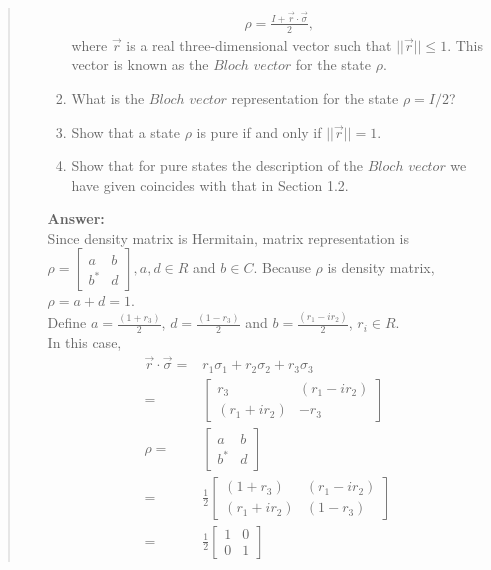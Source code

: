 \documentclass[UTF8]{ctexart}
\begin{document}
\begin{quote}
\begin{enumerate}
\begin{enumerate}
\begin{equation}
	\begin{aligned}
		\rho=\frac{I+\vec{r}\cdot \vec{\sigma}}{2},
	\end{aligned}
\end{equation}
where $\vec{r}$ is a real three-dimensional vector such that $|| \vec{r}||\leq 1$. This vector is
known as the $Bloch $ $vector$ for the state $\rho$.
\item What is the $Bloch$ $ vector$ representation for the state $\rho=I/2$?
\item Show that a state $\rho$ is pure if and only if $|| \vec{r}|| = 1$.
\item  Show that for pure states the description of the $Bloch $ $vector$ we have given
coincides with that in Section 1.2.\\
\end{enumerate}
\textbf{Answer:}\\
Since density matrix is Hermitain, matrix representation is $\rho=\begin{bmatrix}
	a & b \\ b^{*} & d
\end{bmatrix}, a,d \in R$ and $b \in C$. Because $\rho$ is density matrix, $\rho=a+d=1$.\\
Define $a=\frac{(1+r_{3})}{2}$, $d=\frac{(1-r_{3})}{2}$ and $b=\frac{(r_1-ir_{2})}{2}$, $r_{i} \in R $. \\
In this case,\\
\begin{equation}
	\begin{aligned}
		\vec{r}\cdot \vec{\sigma}=&r_{1}\sigma_{1}+r_{2}\sigma_{2}+r_{3}\sigma_{3} \\
								 =&\begin{bmatrix}
									r_{3} &(r_1-ir_{2}) \\
									(r_1+ir_{2}) &-r_{3}
								\end{bmatrix}\\
		\rho=&\begin{bmatrix}
			a & b \\ b^{*} & d
		\end{bmatrix} \\
		=&\frac{1}{2}\begin{bmatrix}
			(1+r_{3})& (r_1-ir_{2}) \\
			(r_1+ir_{2}) & (1-r_{3})
		\end{bmatrix}\\
		=&\frac{1}{2}\begin{bmatrix}
			1 & 0 \\ 0 &1

\end{bmatrix}
\end{aligned}
\end{equation}
\end{enumerate}
\end{quote}
\end{document}
